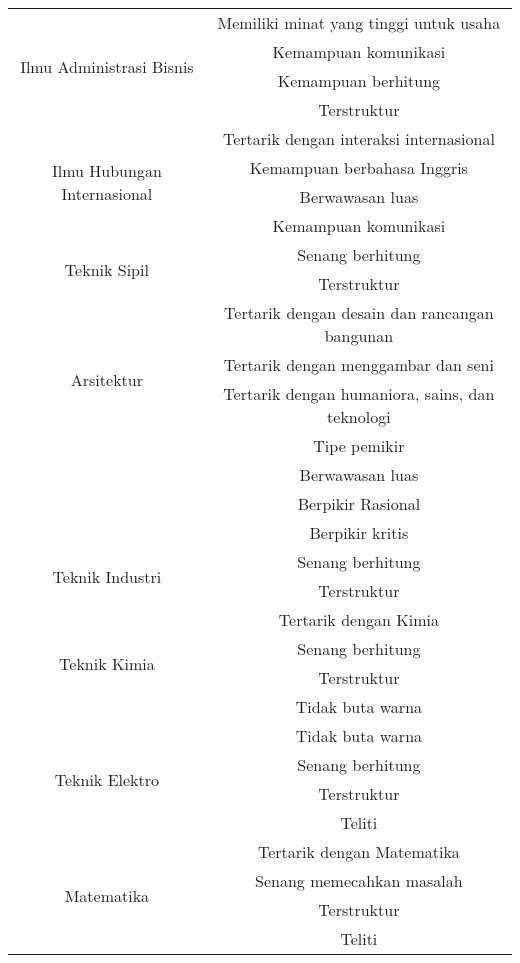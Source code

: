 \begin{table}[H]
\begin{tabular}{| c | c |}
		\hline
		\multirow{4}{10em}{Ilmu Administrasi Bisnis} & Memiliki minat yang tinggi untuk usaha \\
		& Kemampuan komunikasi\\
		& Kemampuan berhitung\\
		& Terstruktur\\
		
		\hline
		\multirow{4}{10em}{Ilmu Hubungan Internasional} & Tertarik dengan interaksi internasional \\
		& Kemampuan berbahasa Inggris \\
		& Berwawasan luas \\
		& Kemampuan komunikasi\\
		
		\hline
		\multirow{2}{10em}{Teknik Sipil} & Senang berhitung \\
		& Terstruktur \\
		
		\hline
		\multirow{4}{10em}{Arsitektur} & Tertarik dengan desain dan rancangan bangunan \\
		& Tertarik dengan menggambar dan seni\\
		& Tertarik dengan humaniora, sains, dan teknologi \\
		
		\hline
		\multirow{4}{10em}{Ilmu Filsafat} & Tipe pemikir \\
		& Berwawasan luas \\
		& Berpikir Rasional \\
		& Berpikir kritis \\
		
		\hline
		\multirow{2}{10em}{Teknik Industri} &  Senang berhitung \\
		& Terstruktur \\
		
		\hline
		\multirow{4}{10em}{Teknik Kimia} & Tertarik dengan Kimia \\
		& Senang berhitung \\
		& Terstruktur \\
		& Tidak buta warna\\
		
		\hline
		\multirow{4}{10em}{Teknik Elektro} & Tidak buta warna \\
		& Senang berhitung \\
		& Terstruktur \\
		& Teliti \\

		\hline
		\multirow{4}{10em}{Matematika} & Tertarik dengan Matematika \\
		& Senang memecahkan masalah \\
		& Terstruktur \\
		& Teliti \\
		

\end{tabular}
\end{table}
